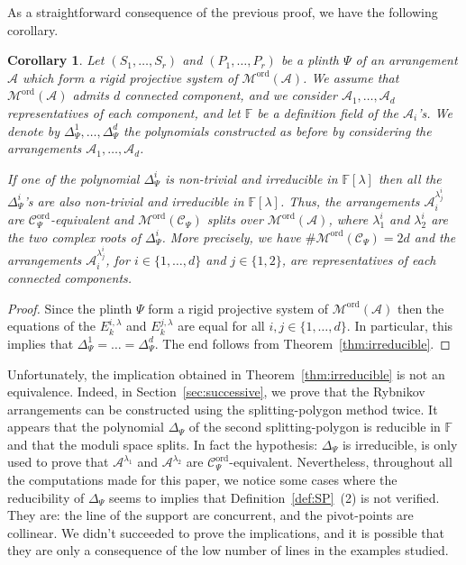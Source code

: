 \documentclass[11pt, a4paper]{amsart}
\newtheorem{corollary}[theorem]{Corollary}
\theoremstyle{definition}
\theoremstyle{remark}
\newcommand{\FF}{\mathds{F}}
\newcommand{\A}{\mathcal{A}}
\newcommand{\C}{\mathcal{C}}
\newcommand{\M}{\mathcal{M}}
\newcommand{\ord}{\text{ord}}
\begin{document}
As a straightforward consequence of the previous proof, we have the following corollary.

\begin{corollary}
	Let $(S_1,\dots,S_r)$ and $(P_1,\dots,P_r)$ be a plinth $\Psi$ of an arrangement $\A$ which form a rigid projective system of  $\M^\ord(\A)$. We assume that $\M^\ord(\A)$ admits $d$ connected component, and we consider $\A_1,\dots,\A_d$ representatives of each component, and let $\FF$ be a definition field of the $\A_i$'s. We denote by $\Delta_{\Psi}^1,\dots,\Delta_{\Psi}^d$ the polynomials constructed as before by considering the arrangements $\A_1,\dots,\A_d$. 
	
	If one of the polynomial $\Delta_{\Psi}^i$ is non-trivial and irreducible in $\FF[\lambda]$ then all the $\Delta_{\Psi}^i$'s are also non-trivial and irreducible in $\FF[\lambda]$. Thus, the arrangements $\A_i^{\lambda_j^i}$ are $\C^\ord_\Psi$-equivalent and  $\M^\ord(\C_\Psi)$ splits over $\M^\ord(\A)$, where $\lambda_1^i$ and $\lambda_2^i$ are the two complex roots of $\Delta_\Psi^i$. More precisely, we have $\# \M^\ord(\C_\Psi) = 2 d$ and the arrangements $\A_i^{\lambda_j^i}$, for $i\in\{1,\dots,d\}$ and $j\in\{1,2\}$, are representatives of each connected components.
\end{corollary}

\begin{proof}
	Since the plinth $\Psi$ form a rigid projective system of $\M^\ord(\A)$ then the equations of the $E_k^{i,\lambda}$ and $E_k^{j,\lambda}$  are equal for all $i,j\in\{1,\dots,d\}$. In particular, this implies that $\Delta_{\Psi}^1 = \dots = \Delta_{\Psi}^d$. The end follows from Theorem~\ref{thm:irreducible}.
\end{proof}

Unfortunately, the implication obtained in Theorem~\ref{thm:irreducible} is not an equivalence. Indeed, in Section~\ref{sec:successive}, we prove that the Rybnikov arrangements can be constructed using the splitting-polygon method twice. It appears that the polynomial $\Delta_{\Psi}$ of the second splitting-polygon is reducible in $\FF$ and that the moduli space splits. In fact the hypothesis: $\Delta_{\Psi}$ is irreducible, is only used to prove that $\A^{\lambda_1}$ and $\A^{\lambda_2}$ are $\C_\Psi^\ord$-equivalent. Nevertheless, throughout all the computations made for this paper, we notice some cases where the reducibility of $\Delta_{\Psi}$ seems to implies that Definition~\ref{def:SP}~(2) is not verified. They are: the line of the support are concurrent, and the pivot-points are collinear. We didn't succeeded to prove the implications, and it is possible that they are only a consequence of the low number of lines in the examples studied.
\end{document}
